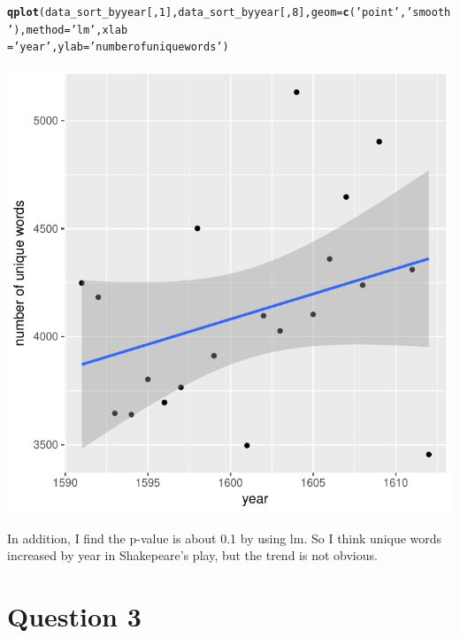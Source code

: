 \documentclass{article}\usepackage[]{graphicx}\usepackage[]{color}
\makeatletter
\def\maxwidth{ %
  \ifdim\Gin@nat@width>\linewidth
    \linewidth
  \else
    \Gin@nat@width
  \fi
}
\newcommand{\hlnum}[1]{\textcolor[rgb]{0.686,0.059,0.569}{#1}}%
\newcommand{\hlstr}[1]{\textcolor[rgb]{0.192,0.494,0.8}{#1}}%
\newcommand{\hlstd}[1]{\textcolor[rgb]{0.345,0.345,0.345}{#1}}%
\newcommand{\hlkwc}[1]{\textcolor[rgb]{0.333,0.667,0.333}{#1}}%
\newcommand{\hlkwd}[1]{\textcolor[rgb]{0.737,0.353,0.396}{\textbf{#1}}}%
\newenvironment{kframe}{%
 \def\at@end@of@kframe{}%
 \ifinner\ifhmode%
  \def\at@end@of@kframe{\end{minipage}}%
  \begin{minipage}{\columnwidth}%
 \fi\fi%
 \def\FrameCommand##1{\hskip\@totalleftmargin \hskip-\fboxsep
 \colorbox{shadecolor}{##1}\hskip-\fboxsep
     \hskip-\linewidth \hskip-\@totalleftmargin \hskip\columnwidth}%
 \MakeFramed {\advance\hsize-\width
   \@totalleftmargin\z@ \linewidth\hsize
   \@setminipage}}%
 {\par\unskip\endMakeFramed%
 \at@end@of@kframe}
\newenvironment{knitrout}{}{} %
\makeatother
\begin{document}
\begin{knitrout}
\color{fgcolor}\begin{kframe}
\begin{alltt}
\hlkwd{qplot}\hlstd{(data_sort_byyear[,}\hlnum{1}\hlstd{],data_sort_byyear[,}\hlnum{8}\hlstd{],}\hlkwc{geom}\hlstd{=}\hlkwd{c}\hlstd{(}\hlstr{'point'}\hlstd{,}\hlstr{'smooth'}\hlstd{),}\hlkwc{method}\hlstd{=}\hlstr{'lm'}\hlstd{,}\hlkwc{xlab}
\hlstd{=} \hlstr{'year'}\hlstd{,}\hlkwc{ylab} \hlstd{=} \hlstr{'number of unique words'}\hlstd{)}
\end{alltt}


{\ttfamily\noindent\color{warningcolor}{\#\# Warning: Ignoring unknown parameters: method}}\end{kframe}
\includegraphics[width=\maxwidth]{figure/r-chunk15-1} 

\end{knitrout}

In addition, I find the p-value is about 0.1 by using lm. So I think unique words increased by year in Shakepeare's play, but the trend is not obvious.

\section{Question 3}
\end{document}
